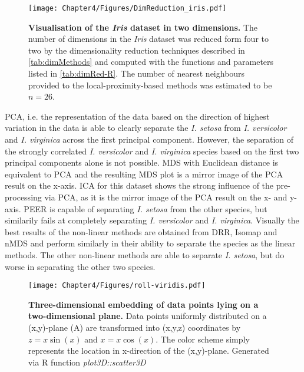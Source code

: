 \begin{figure}[h!]
	\centering
	\texttt{[image: Chapter4/Figures/DimReduction\_iris.pdf]}
	\caption[\textbf{Visualisation of the \textit{Iris} dataset in two dimensions.}]{\textbf{Visualisation of the \textit{Iris} dataset in two dimensions.} The number of dimensions in the \textit{Iris} dataset was reduced form four to two by the dimensionality reduction techniques described in \cref{tab:dimMethods} and computed with the functions and parameters listed in \cref{tab:dimRed-R}. The number of nearest neighbours provided to the local-proximity-based methods was estimated to be \(n=26\).} 
	 	\label{fig:dimRed-iris}
\end{figure}

PCA, i.e. the representation of the data based on the direction of highest variation in the data is able to clearly separate the \textit{I. setosa} from \textit{I. versicolor} and \textit{I. virginica} across the first principal component. However, the separation of the strongly correlated \textit{I. versicolor} and \textit{I. virginica} species based on the first two principal components alone is not possible. MDS with Euclidean distance is equivalent to PCA and the resulting MDS plot is a mirror image of the PCA result on the x-axis. ICA for this dataset shows the strong influence of the pre-processing via PCA, as it is the mirror image of the PCA result on the x- and y-axis. PEER is capable of separating \textit{I. setosa} from the other species, but similarily fails at completely separating \textit{I. versicolor} and \textit{I. virginica}. 
Visually the best results of the non-linear methods are obtained from DRR, Isomap and nMDS and perform similarly in their ability to separate the species as the linear methods. The other non-linear methods are able to separate \textit{I. setosa}, but do worse in separating the other two species.

\begin{figure}[p]
	\centering
	\texttt{[image: Chapter4/Figures/roll-viridis.pdf]}\\
	\caption[\textbf{Three-dimensional embedding of datapoints lying on a two-dimensional plane.}]{\textbf{Three-dimensional embedding of data points lying on a two-dimensional plane.} Data points uniformly distributed on a (x,y)-plane (A) are transformed into (x,y,z) coordinates by \(z = x \sin(x)\) and \(x = x \cos(x)\). The color scheme simply represents the location in x-direction of the (x,y)-plane.  Generated via R function \textit{plot3D::scatter3D}}
 	\label{fig:roll}
\end{figure}

